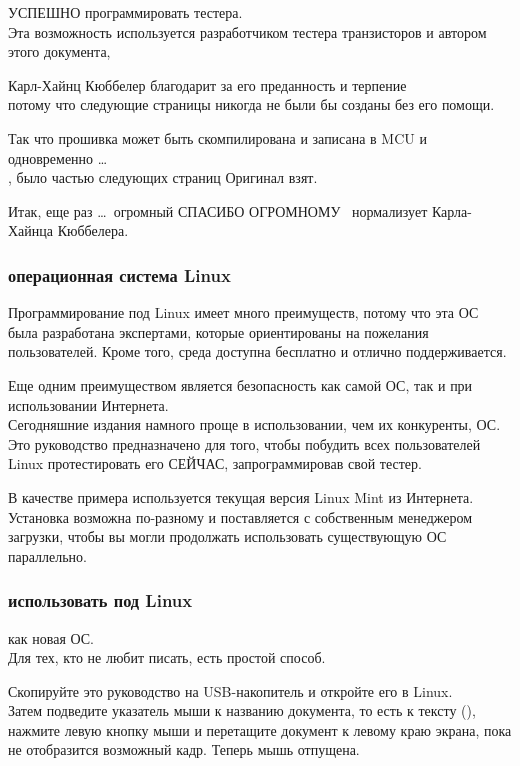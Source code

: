 УСПЕШНО программировать тестера. \\
Эта возможность используется разработчиком тестера транзисторов и автором этого документа,

Карл-Хайнц Кюббелер благодарит \cite {karlheinz1} за его преданность и терпение \\
потому что следующие страницы никогда не были бы созданы без его помощи.
     
Так что прошивка может быть скомпилирована и записана в MCU и одновременно \dots \\
, было частью следующих страниц
Оригинал взят.

Итак, еще раз \dots \ огромный {СПАСИБО ОГРОМНОМУ}
\ нормализует Карла-Хайнца Кюббелера.
\subsubsection{операционная система Linux}
Программирование под Linux имеет много преимуществ, потому что эта ОС была разработана экспертами, которые ориентированы на пожелания пользователей.
Кроме того, среда доступна бесплатно и отлично поддерживается.

Еще одним преимуществом является безопасность как самой ОС, так и при использовании Интернета. \\
Сегодняшние издания намного проще в использовании, чем их конкуренты, ОС. \\
Это руководство предназначено для того, чтобы побудить всех  пользователей Linux протестировать его СЕЙЧАС, запрограммировав свой тестер.

В качестве примера используется текущая версия Linux Mint из Интернета.
\\ Установка возможна по-разному и поставляется с собственным менеджером загрузки, чтобы вы могли продолжать использовать существующую ОС параллельно.
\subsubsection{использовать под Linux}
как новая ОС. \\
Для тех, кто не любит писать, есть простой способ.

Скопируйте это руководство на USB-накопитель и откройте его в Linux. \\
Затем подведите указатель мыши к названию документа, то есть к тексту (),
нажмите левую кнопку мыши и перетащите документ к левому краю экрана, пока не отобразится возможный кадр.
Теперь мышь отпущена.

